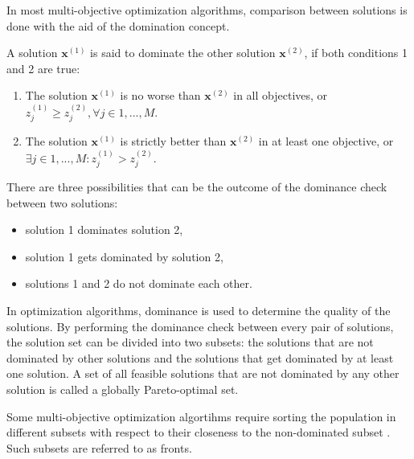 In most multi-objective optimization algorithms, comparison between solutions is done with the aid of the domination concept. 

\begin{mydef}
A solution $\textbf{x}^{(1)}$ is said to dominate the other solution $\textbf{x}^{(2)}$, if both conditions 1 and 2 are true: 
\begin{enumerate}
    \item The solution $\textbf{x}^{(1)}$ is no worse than $\textbf{x}^{(2)}$ in all objectives, or $z_j^{(1)} \geq z_j^{(2)}, \forall j \in {1,...,M}$.
    \item The solution $\textbf{x}^{(1)}$ is strictly better than $\textbf{x}^{(2)}$ in at least one objective, or $\exists j \in {1,...,M}: z_j^{(1)} > z_j^{(2)}$.
\end{enumerate}
\end{mydef}
There are three possibilities that can be the outcome of the dominance check between two solutions:
\begin{itemize}
    \item solution 1 dominates solution 2, 
    \item solution 1 gets dominated by solution 2,
    \item solutions 1 and 2 do not dominate each other.
\end{itemize}

In optimization algorithms, dominance is used to determine the quality of the solutions. 
By performing the dominance check between every pair of solutions, the solution set can be divided into two subsets: the solutions that are not dominated by other solutions and the solutions that get dominated by at least one solution. 
A set of all feasible solutions that are not dominated by any other solution is called a globally Pareto-optimal set. 

Some multi-objective optimization algortihms require sorting the population in different subsets with respect to their closeness to the non-dominated subset \cite{cupic2013prirodom}. 
Such subsets are referred to as fronts. 

